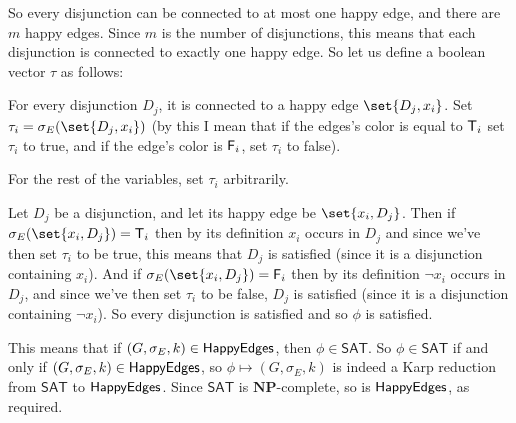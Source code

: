 \documentclass[10pt]{article}
\def\sat{\mathsf{SAT}}
\def\NP{\mathbf{NP}}
\begin{document}
So every disjunction can be connected to at most one happy edge, and there are $m$ happy edges.
Since $m$ is the number of disjunctions, this means that each disjunction is connected to exactly one happy edge.
So let us define a boolean vector $\tau$ as follows:
\benum
    \item For every disjunction $D_j$, it is connected to a happy edge $\set{D_j,x_i}$.
    Set $\tau_i=\sigma_E(\set{D_j,x_i})$ (by this I mean that if the edges's color is equal to $\mathsf{T}_i$ set $\tau_i$ to true, and if the edge's color is $\mathsf{F}_i$, set $\tau_i$ to false).
    \item For the rest of the variables, set $\tau_i$ arbitrarily.
\eenum

Let $D_j$ be a disjunction, and let its happy edge be $\set{x_i,D_j}$.
Then if $\sigma_E(\set{x_i,D_j})=\T_i$ then by its definition $x_i$ occurs in $D_j$ and since we've then set $\tau_i$ to be true, this means that $D_j$ is satisfied (since it is a disjunction containing
$x_i$).
And if $\sigma_E(\set{x_i,D_j})=\F_i$ then by its definition $\neg x_i$ occurs in $D_j$, and since we've then set $\tau_i$ to be false, $D_j$ is satisfied (since it is a disjunction containing $\neg x_i$).
So every disjunction is satisfied and so $\phi$ is satisfied.

This means that if $(G,\sigma_E,k)\in\mathsf{HappyEdges}$, then $\phi\in\sat$.
So $\phi\in\sat$ if and only if $(G,\sigma_E,k)\in\mathsf{HappyEdges}$, so $\phi\mapsto(G,\sigma_E,k)$ is indeed a Karp reduction from $\sat$ to $\mathsf{HappyEdges}$.
Since $\sat$ is $\NP$-complete, so is $\mathsf{HappyEdges}$, as required.
\end{document}
